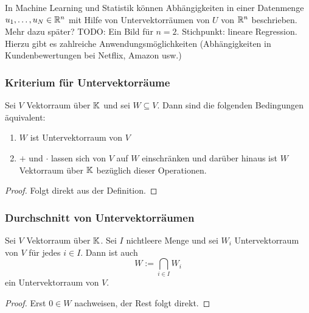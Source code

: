 \begin{bsp}
	In Machine Learning und Statistik können Abhängigkeiten in einer Datenmenge $u_1,\ldots, u_N \in \mathbb R^n$ mit Hilfe von Untervektorräumen von $U$ von $\mathbb R^n$ beschrieben. Mehr dazu später? TODO: Ein Bild für $n=2$. Stichpunkt: lineare Regression. Hierzu gibt es zahlreiche Anwendungsmöglichkeiten (Abhängigkeiten in Kundenbewertungen bei Netflix, Amazon usw.)
\end{bsp} 


\subsubsection{Kriterium für Untervektorräume}
\begin{thm}
	Sei $ V $ Vektorraum über $ \mathbb K $ und sei $ W \subseteq V $. Dann sind die folgenden Bedingungen äquivalent:
	\begin{enumerate}
		\item
			$ W $ ist Untervektorraum von $ V $
		\item
			$ + $ und $ \cdot $ lassen sich von $ V $ auf $ W $ einschränken und darüber hinaus ist $ W $ Vektorraum über $ \mathbb K $ bezüglich dieser Operationen.
	\end{enumerate}
\end{thm}
\begin{proof}
	Folgt direkt aus der Definition.
\end{proof}

\subsubsection{Durchschnitt von Untervektorräumen}
\begin{propn}
	Sei $ V $ Vektorraum über $ \mathbb K $. Sei $ I $ nichtleere Menge und sei $ W_i $ Untervektorraum von $ V $ für jedes $ i \in I $. Dann ist auch
	\begin{equation*}
		W := \bigcap_{i \in I} W_i
	\end{equation*}
	ein Untervektorraum von $ V $. %
\end{propn}
\begin{proof}
	Erst $ 0 \in W $ nachweisen, der Rest folgt direkt.
\end{proof}

